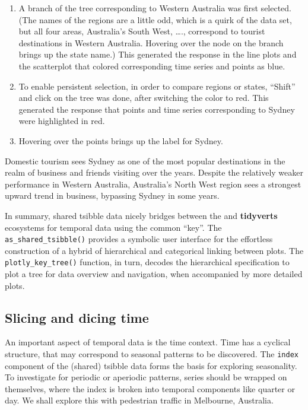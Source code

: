 \begin{enumerate}
\def\labelenumi{\arabic{enumi}.}
\tightlist
\item
  A branch of the tree corresponding to Western Australia was first selected. (The names of the regions are a little odd, which is a quirk of the data set, but all four areas, Australia's South West, \ldots., correspond to tourist destinations in Western Australia. Hovering over the node on the branch brings up the state name.) This generated the response in the line plots and the scatterplot that colored corresponding time series and points as blue.
\item
  To enable persistent selection, in order to compare regions or states, ``Shift'' and click on the tree was done, after switching the color to red. This generated the response that points and time series corresponding to Sydney were highlighted in red.
\item
  Hovering over the points brings up the label for Sydney.
\end{enumerate}

Domestic tourism sees Sydney as one of the most popular destinations in the realm of business and friends visiting over the years. Despite the relatively weaker performance in Western Australia, Australia's North West region sees a strongest upward trend in business, bypassing Sydney in some years.

In summary, shared tsibble data nicely bridges between the  and \textbf{tidyverts} ecosystems for temporal data using the common ``key''. The \texttt{as\_shared\_tsibble()} provides a symbolic user interface for the effortless construction of a hybrid of hierarchical and categorical linking between plots. The \texttt{plotly\_key\_tree()} function, in turn, decodes the hierarchical specification to plot a tree for data overview and navigation, when accompanied by more detailed plots.

\hypertarget{slicing-and-dicing-time}{%
\subsection{Slicing and dicing time}\label{slicing-and-dicing-time}}

An important aspect of temporal data is the time context. Time has a cyclical structure, that may correspond to seasonal patterns to be discovered. The \texttt{index} component of the (shared) tsibble data forms the basis for exploring seasonality. To investigate for periodic or aperiodic patterns, series should be wrapped on themselves, where the index is broken into temporal components like quarter or day. We shall explore this with pedestrian traffic in Melbourne, Australia.

